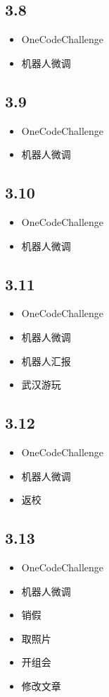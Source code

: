 \documentclass[UTF8]{ctexart}
\begin{document}
\subsection*{3.8}
\begin{itemize}
    \item OneCodeChallenge
    \item 机器人微调
\end{itemize}

\subsection*{3.9}
\begin{itemize}
    \item OneCodeChallenge
    \item 机器人微调
\end{itemize}

\subsection*{3.10}
\begin{itemize}
    \item OneCodeChallenge
    \item 机器人微调
\end{itemize}

\subsection*{3.11}
\begin{itemize}
    \item OneCodeChallenge
    \item 机器人微调
    \item 机器人汇报
    \item 武汉游玩
\end{itemize}

\subsection*{3.12}
\begin{itemize}
    \item OneCodeChallenge
    \item 机器人微调
    \item 返校
\end{itemize}

\subsection*{3.13}
\begin{itemize}
    \item OneCodeChallenge
    \item 机器人微调
    \item 销假
    \item 取照片
    \item 开组会
    \item 修改文章
\end{itemize}
\end{document}
